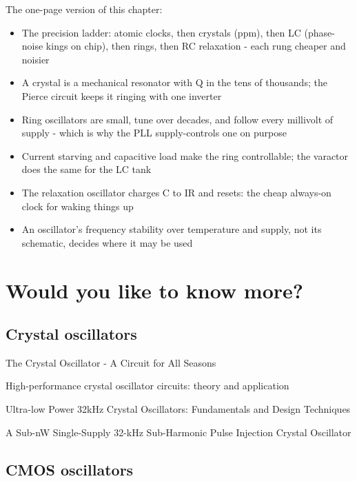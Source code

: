 The one-page version of this chapter:

\begin{itemize}
\tightlist
\item
  The precision ladder: atomic clocks, then crystals (ppm), then LC
  (phase-noise kings on chip), then rings, then RC relaxation - each
  rung cheaper and noisier
\item
  A crystal is a mechanical resonator with Q in the tens of thousands;
  the Pierce circuit keeps it ringing with one inverter
\item
  Ring oscillators are small, tune over decades, and follow every
  millivolt of supply - which is why the PLL supply-controls one on
  purpose
\item
  Current starving and capacitive load make the ring controllable; the
  varactor does the same for the LC tank
\item
  The relaxation oscillator charges C to IR and resets: the cheap
  always-on clock for waking things up
\item
  An oscillator's frequency stability over temperature and supply, not
  its schematic, decides where it may be used
\end{itemize}

\section{Would you like to know
more?}\label{would-you-like-to-know-more}

\subsection{Crystal oscillators}\label{crystal-oscillators-1}

The Crystal Oscillator - A Circuit for All Seasons

High-performance crystal oscillator circuits: theory and application

Ultra-low Power 32kHz Crystal Oscillators: Fundamentals and Design
Techniques 

A Sub-nW Single-Supply 32-kHz Sub-Harmonic Pulse Injection Crystal
Oscillator 

\subsection{CMOS oscillators}\label{cmos-oscillators}

